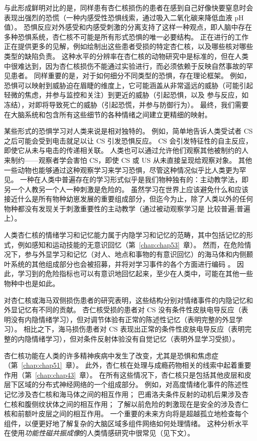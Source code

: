 与此形成鲜明对比的是，同样患有杏仁核损伤的患者在感到自己好像快要窒息时会表现出强烈的恐慌（一种内感受性恐惧线索，通过吸入二氧化碳来降低血液 pH 值）。
恐惧反应对外感受和内感受刺激的分离支持了这样一种观点，即人脑中存在多种恐惧系统，杏仁核不可能是所有形式恐惧的唯一必要结构。
正在进行的工作正在提供更多的见解，例如绘制出这些患者受损的特定杏仁核，以及哪些核对哪些类型的缺陷负责。
这种水平的分辨率在杏仁核的动物研究中是标准的，但在人类中很难达到，因为杏仁核损伤不能通过实验进行，而必须依赖于反映自然事故的罕见患者。
同样重要的是，对于如何细分不同类型的恐惧，存在理论框架。
例如，恐惧可以映射到威胁迫在眉睫的维度上，它可能涵盖从非常遥远的威胁（可能引起轻微的焦虑，并参与监控和关注）到更近的威胁（引起恐惧，以及 参与反应，如冻结），对即将导致死亡的威胁（引起恐慌，并参与防御行为）。
最终，我们需要在大脑系统和包含所有这些细节的各种情绪之间建立更精细的映射。


某些形式的恐惧学习对人类来说是相对独特的。
例如，简单地告诉人类受试者 CS 之后可能会受到电击就足以让 CS 引发恐惧反应。
CS 会引发特征性的自主反应，即使它从未与电击的传递相关联。
人类也可以通过允许他们观察其他被制约的人来制约——观察者学会害怕 CS，即使 CS 或 US 从未直接呈现给观察对象。
其他一些动物也能够通过这种观察学习来学习恐惧，尽管这种情况似乎比人类更为罕见。
一种在人类中普遍存在的学习形式似乎是我们物种独有的：主动教学法，即另一个人教另一个人一种刺激是危险的。
虽然学习在世界上应该避免什么和应该接近什么是所有物种幼崽发展的重要组成部分，但迄今为止，除了人类以外的任何物种都没有发现关于刺激重要性的主动教学（通过被动观察学习是 比较普遍;普遍上）。


人类杏仁核的情绪学习和记忆能力属于内隐学习和记忆的范畴，其中包括记忆的形式，例如感知和运动技能的无意识回忆（第~\ref{chap:chap53}~章）。
然而，在危险情况下，参与外显学习和记忆（对人、地点和事物的有意识回忆）的海马体和内侧颞叶系统的其他组成部分也会被招募，并将对学习事件的各个方面进行编码 。
因此，学习到的危险指标也可以有意识地回忆起来，至少在人类中，可能在其他一些物种中也是如此。


对杏仁核或海马双侧损伤患者的研究表明，这些结构分别对情绪事件的内隐记忆和外显记忆有不同的贡献。
杏仁核受损的患者对 CS 没有条件性皮肤电导反应（表明没有内隐情绪学习），但对调节体验有正常的陈述性记忆（表明完整的外显学习）。
相比之下，海马损伤患者对 CS 表现出正常的条件性皮肤电导反应（表明完整的内隐情绪学习），但对条件反射体验没有自觉记忆（表明外显学习受损）。


杏仁核功能在人类的许多精神疾病中发生了改变，尤其是恐惧和焦虑症（第~\ref{chap:chap51}~章）。
此外，杏仁核在处理与成瘾药物相关的线索中起着重要作用（第~\ref{chap:chap43}~章）。
在所有这些情况下，杏仁核只是包括其他皮层和皮层下区域的分布式神经网络的一个组成部分。
例如，对高度情绪化事件的陈述性记忆涉及杏仁核和海马体之间的相互作用；
巴甫洛夫条件反射的动机后果涉及杏仁核和腹侧纹状体之间的相互作用；
了解以前危险的刺激现在是安全的涉及杏仁核和前额叶皮层之间的相互作用。
一个重要的未来方向将是超越孤立地检查每个组件，以便更好地了解复杂的大脑区域多组件网络如何处理情绪。
这种分析水平在使用\textit{功能性磁共振成像}的人类情感研究中很常见（见下文）。



